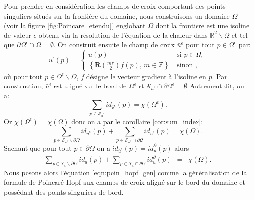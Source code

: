 Pour prendre en considération les champs de croix comportant des points singuliers situés sur la frontière du domaine, nous construisons un domaine $\Omega^\epsilon$ (voir la figure   \ref{fig:Poincare_etendu}) englobant $\Omega$ dont la frontiere est une isoline de valeur $\epsilon$ obtenu via la résolution de l'équation de la chaleur dans $\mathbb{R}^2\backslash\Omega$ et tel que $\partial\Omega^\epsilon\cap\Omega=\emptyset$. On construit ensuite le champ de croix $\bar{u}^\epsilon$ pour tout $p\in\Omega^\epsilon$ par:
$$
\bar{u}^\epsilon(p)=
\left\{
\begin{array}{ll}
\bar{u}(p)& \mbox{ si } p\in\Omega,\\[0.5cm]
\left\{\mathbf{R}\left(\displaystyle\frac{m\pi}{2}\right)f(p),~ m\in \mathbb{Z}\right\} & \mbox{ sinon },
\end{array}
\right.
$$
où pour tout $p\in\Omega^\epsilon\backslash\Omega$, $f$ désigne le vecteur gradient à l'isoline en $p$. Par construction, $\bar{u}^\epsilon$ est aligné sur le bord de $\Omega^\epsilon$ et $\mathcal{S}_{\bar{u}^\epsilon}\cap\partial\Omega^\epsilon=\emptyset$ Autrement dit, on a:
$$
\sum_{p\in\mathcal{S}_{\bar{u}^\epsilon}} id_{\bar{u}^\epsilon}(p)=\chi(\Omega^\epsilon).
$$
Or $\chi(\Omega^\epsilon)=\chi(\Omega)$ donc on a par le corollaire \ref{cor:sum_index}:
$$
\sum_{p\in\mathcal{S}_{\bar{u}^\epsilon}\backslash\partial\Omega} id_{\bar{u}^\epsilon}(p)+\sum_{p\in\mathcal{S}_{\bar{u}^\epsilon}\cap\partial\Omega} id_{\bar{u}^\epsilon}(p)=\chi(\Omega).
$$
Sachant que pour tout $p\in\partial\Omega$ on a $id_{\bar{u}^\epsilon}(p)=id^\partial_{\bar{u}}(p)$ alors
\begin{eqnarray}
    \label{eqn:poin_hopf_gen}
    \sum_{p\in\mathcal{S}_{\bar{u}}\backslash\partial\Omega} id_{\bar{u}}(p)+\sum_{p\in\mathcal{S}_{\bar{u}}\cap\partial\Omega} id^\partial_{\bar{u}}(p)&=&\chi(\Omega).
\end{eqnarray}
Nous posons alors l'équation \eqref{eqn:poin_hopf_gen} comme la généralisation de la formule de Poincaré-Hopf aux champs de croix aligné sur le bord du domaine et possédant des points singuliers de bord.


